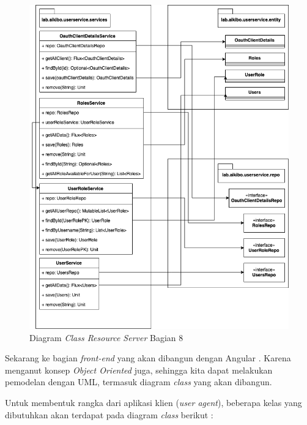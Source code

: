 \documentclass[pdftex,12pt, oneside]{article}
\begin{document}
\begin{enumerate}
	\begin{figure}[H]
		\centering
		\includegraphics[width=1\textwidth]{./resources/class-dia-resource-8}
		\caption{Diagram \textit{Class Resource Server} Bagian 8}
		\label{fig:class-dia-resource-8}
	\end{figure}

\end{enumerate}

Sekarang ke bagian \textit{front-end} yang akan dibangun dengan Angular . Karena menganut konsep \textit{Object Oriented} juga, sehingga kita dapat melakukan pemodelan dengan UML, termasuk diagram \textit{class} yang akan dibangun. 

Untuk membentuk rangka dari aplikasi klien (\textit{user agent}), beberapa kelas yang dibutuhkan akan terdapat pada diagram \textit{class} berikut :
\end{document}
